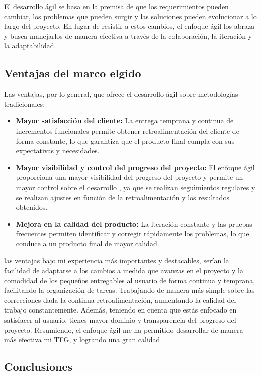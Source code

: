 El desarrollo ágil se basa en la premisa de que los requerimientos pueden cambiar, los problemas que pueden surgir y las soluciones pueden evolucionar a lo largo del proyecto. En lugar de resistir a estos cambios, el enfoque ágil los abraza y busca manejarlos de manera efectiva a través de la colaboración, la iteración y la adaptabilidad.

\subsection{Ventajas del marco elgido}

Las ventajas, por lo general, que ofrece el desarrollo ágil sobre metodologías tradicionales:

\begin{itemize}
\item \textbf{Mayor satisfacción del cliente:} La entrega temprana y continua de incrementos funcionales permite obtener retroalimentación del cliente de forma constante, lo que garantiza que el producto final cumpla con sus expectativas y necesidades.
\item \textbf{Mayor visibilidad y control del progreso del proyecto:} El enfoque ágil proporciona una mayor visibilidad del progreso del proyecto y permite un mayor control sobre el desarrollo \cite{VCagileT}, ya que se realizan seguimientos regulares y se realizan ajustes en función de la retroalimentación y los resultados obtenidos.
\item \textbf{Mejora en la calidad del producto:} La iteración constante y las pruebas frecuentes permiten identificar y corregir rápidamente los problemas, lo que conduce a un producto final de mayor calidad.
\end{itemize}

las ventajas bajo mi experiencia más importantes y destacables, serían la facilidad de adaptarse a los cambios a medida que avanzas en el proyecto y la comodidad de los pequeños entregables al usuario de forma continua y temprana, facilitando la organización de tareas. Trabajando de manera más simple sobre las correcciones dada la continua retroalimentación, aumentando la calidad del trabajo constantemente. Además, teniendo en cuenta que estás enfocado en satisfacer al usuario, tienes mayor dominio y transparencia del progreso del proyecto. Resumiendo, el enfoque ágil me ha permitido desarrollar de manera más efectiva mi TFG, y logrando una gran calidad.


\subsection{Conclusiones}

